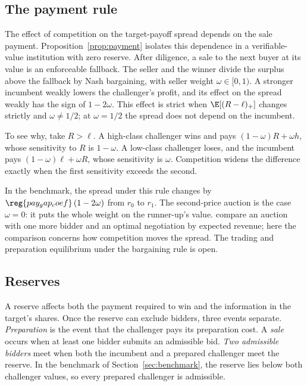 \subsection{The payment rule}\label{sec:payment}

The effect of competition on the target-payoff spread depends on the sale payment. Proposition~\ref{prop:payment}
isolates this dependence in a verifiable-value institution with zero reserve. After diligence, a sale to the next
buyer at its value is an enforceable fallback. The seller and the winner divide the surplus above the fallback by Nash
bargaining, with seller weight \(\omega\in[0,1)\). A stronger incumbent weakly lowers the challenger's profit, and
its effect on the spread weakly has the sign of \(1-2\omega\). This effect is strict when \(\E[(R-\ell)_+]\) changes
strictly and \(\omega\ne1/2\); at \(\omega=1/2\) the spread does not depend on the incumbent.

To see why, take \(R>\ell\). A high-class challenger wins and pays \((1-\omega)R+\omega h\), whose sensitivity to
\(R\) is \(1-\omega\). A low-class challenger loses, and the incumbent pays \((1-\omega)\ell+\omega R\), whose
sensitivity is \(\omega\). Competition widens the difference exactly when the first sensitivity exceeds the second.

In the benchmark, the spread under this rule changes by \(\reg{pay_gap_coef}\,(1-2\omega)\) from \(r_0\) to \(r_1\).
The second-price auction is the case \(\omega=0\): it puts the whole weight on the runner-up's value.
\citet{BulowKlemperer1996} compare an auction with one more bidder and an optimal negotiation by expected revenue;
here the comparison concerns how competition moves the spread. The trading and preparation equilibrium under the
bargaining rule is open.

\subsection{Reserves}\label{sec:reserves}

A reserve affects both the payment required to win and the information in the target's shares. Once the reserve can
exclude bidders, three events separate. \emph{Preparation} is the event that the challenger pays its preparation
cost. A \emph{sale} occurs when at least one bidder submits an admissible bid. \emph{Two admissible bidders} meet
when both the incumbent and a prepared challenger meet the reserve. In the benchmark of Section~\ref{sec:benchmark},
the reserve lies below both challenger values, so every prepared challenger is admissible.

